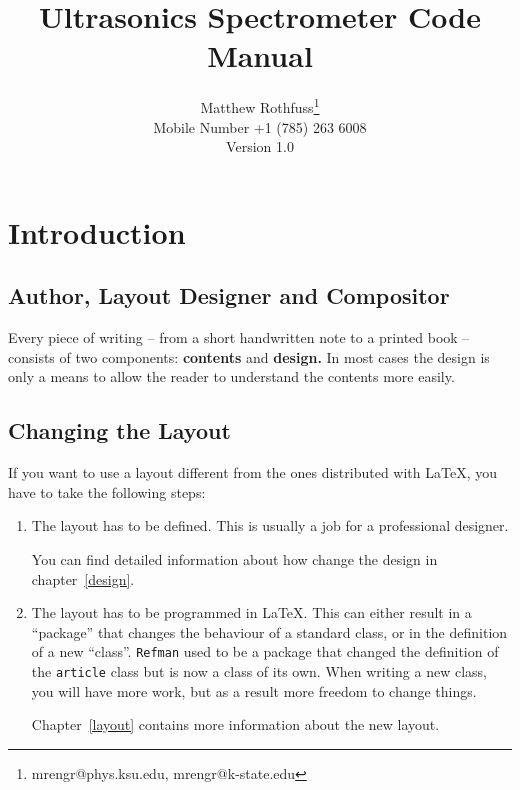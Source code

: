 \documentclass[twoside,a4paper]{refart}
\title{Ultrasonics Spectrometer Code Manual}
\author{Matthew Rothfuss\thanks{mrengr@phys.ksu.edu,  mrengr@k-state.edu} \\
	Mobile Number {+1 (785) 263 6008} \\
	Version 1.0}
\date{}
\begin{document}
\maketitle

\newpage

\tableofcontents

\newpage



\section{Introduction}

\subsection{Author, Layout Designer and Compositor}

Every piece of writing -- from a short handwritten note to a printed 
book -- consists of two components: \textbf{contents} and 
\textbf{design.} In most cases the design is only a means to allow 
the reader to understand the contents more easily.


\subsection{Changing the Layout}

If you want to use a layout different from the ones distributed with 
\LaTeX, you have to take the following steps: 

\begin{enumerate}

\item
    The layout has to be defined.
        This is usually a job for a professional designer.

        You can find detailed information about how change the design in 
        chapter~\ref{design}.

\item
        The layout has to be programmed in \LaTeX. This can either result in 
        a ``package'' that changes the behaviour of a standard class, or 
        in the definition of a new ``class''. \texttt{Refman} used to be a 
        package that changed the definition of the \texttt{article} 
        class but is now a class of its own. When writing a new class, you 
        will have more work, but as a result more freedom to change things.
        
        Chapter~\ref{layout} contains more information about the new layout.
        
\end{enumerate}
\end{document}
